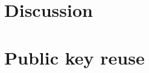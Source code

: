 \section{Discussion}


%
%

\appendix

\ifext
\section{Public key reuse}
\label{sec:pub_key_reuse}

